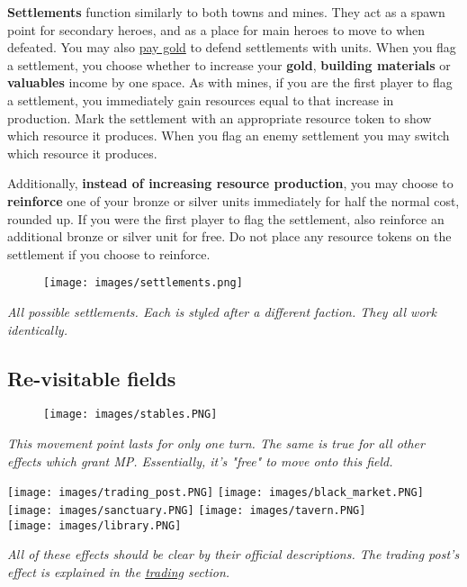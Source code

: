 \documentclass[12pt]{article}
\begin{document}
\clearpage
\textbf{Settlements} function similarly to both towns and mines. They act as a spawn point for secondary heroes, and as a place for main heroes to move to when defeated. You may also \hyperlink{Town}{pay gold} to defend settlements with units. When you flag a settlement, you choose whether to increase your \textbf{gold}, \textbf{building materials} or \textbf{valuables} income by one space. As with mines, if you are the first player to flag a settlement, you immediately gain resources equal to that increase in production. Mark the settlement with an appropriate resource token to show which resource it produces. When you flag an enemy settlement you may switch which resource it produces.\par
Additionally, \textbf{instead of increasing resource production}, you may choose to \textbf{reinforce} one of your bronze or silver units immediately for half the normal cost, rounded up. If you were the first player to flag the settlement, also reinforce an additional bronze or silver unit for free. Do not place any resource tokens on the settlement if you choose to reinforce.
\begin{figure}[h]
\centering
\texttt{[image: images/settlements.png]}
\end{figure}
\begin{center}
\textit{All possible settlements. Each is styled after a different faction. They all work identically.}
\end{center}

\subsection*{Re-visitable fields}
\begin{figure}[h]
\centering
\texttt{[image: images/stables.PNG]}
\end{figure}
\begin{center}
\textit{This movement point lasts for only one turn. The same is true for all other effects which grant MP. Essentially, it's "free" to move onto this field.}
\end{center}

\clearpage

\texttt{[image: images/trading\_post.PNG]}
\texttt{[image: images/black\_market.PNG]}\\
\texttt{[image: images/sanctuary.PNG]}
\texttt{[image: images/tavern.PNG]}\\
\texttt{[image: images/library.PNG]}\par
\textit{All of these effects should be clear by their official descriptions. The trading post's effect is explained in the \hyperlink{Trading}{trading} section.}
\clearpage
\end{document}
